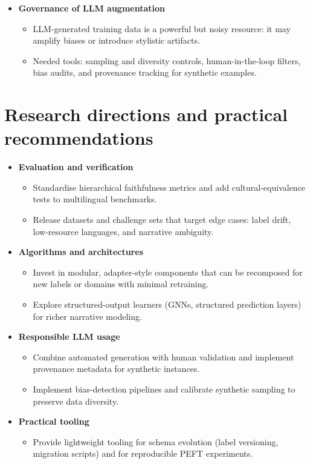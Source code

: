 \begin{itemize}
	\item \textbf{Governance of LLM augmentation}
		\begin{itemize}
			\item LLM-generated training data is a powerful but noisy resource: it may amplify biases or introduce stylistic artifacts.
			\item Needed tools: sampling and diversity controls, human-in-the-loop filters, bias audits, and provenance tracking for synthetic examples.
		\end{itemize}
\end{itemize}

\section{Research directions and practical recommendations}

\begin{itemize}
	\item \textbf{Evaluation and verification}
		\begin{itemize}
			\item Standardise hierarchical faithfulness metrics and add cultural-equivalence tests to multilingual benchmarks.
			\item Release datasets and challenge sets that target edge cases: label drift, low-resource languages, and narrative ambiguity.
		\end{itemize}

	\item \textbf{Algorithms and architectures}
		\begin{itemize}
			\item Invest in modular, adapter-style components that can be recomposed for new labels or domains with minimal retraining.
			\item Explore structured-output learners (GNNs, structured prediction layers) for richer narrative modeling.
		\end{itemize}

	\item \textbf{Responsible LLM usage}
		\begin{itemize}
			\item Combine automated generation with human validation and implement provenance metadata for synthetic instances.
			\item Implement bias-detection pipelines and calibrate synthetic sampling to preserve data diversity.
		\end{itemize}

	\item \textbf{Practical tooling}
		\begin{itemize}
			\item Provide lightweight tooling for schema evolution (label versioning, migration scripts) and for reproducible PEFT experiments.
		\end{itemize}
\end{itemize}

